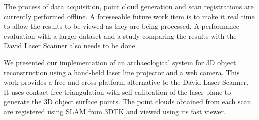 The process of data acquisition, point cloud generation and scan registrations
are currently performed offline. A foreseeable future work item is to make it
real time to allow the results to be viewed as they are being processed. A
performance evaluation with a larger dataset and a study comparing the results
with the David Laser Scanner also needs to be done.

We presented our implementation of an archaeological system for 3D object
reconstruction using a hand-held laser line projector and a web camera.  This
work provides a free and cross-platform alternative to the David Laser
Scanner. It uses contact-free triangulation with self-calibration of the laser
plane to generate the 3D object surface points. The point clouds obtained from
each scan are registered using \ac{SLAM} from \ac{3DTK} and viewed using its
fast viewer.
